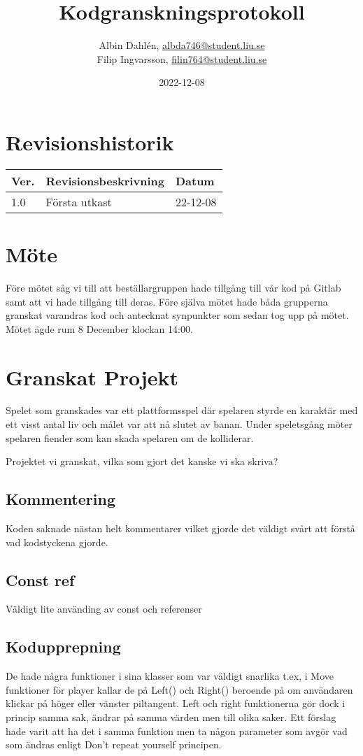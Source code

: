 \documentclass{TDP005mall}
\author{Albin Dahlén, \url{albda746@student.liu.se}\\
  Filip Ingvarsson, \url{filin764@student.liu.se}}
\title{Kodgranskningsprotokoll}
\date{2022-12-08}
\begin{document}
\projectpage
\section{Revisionshistorik}
\begin{table}[!h]
\begin{tabularx}{\linewidth}{|l|X|l|}
\hline
Ver. & Revisionsbeskrivning & Datum \\\hline
1.0 & Första utkast & 22-12-08 \\\hline
\end{tabularx}
\end{table}

\section{Möte}
Före mötet såg vi till att beställargruppen hade tillgång till vår kod på Gitlab samt att vi hade tillgång till deras.
Före själva mötet hade båda grupperna granskat varandras kod och antecknat synpunkter som sedan tog upp på mötet.
Mötet ägde rum 8 December klockan 14:00.

\section{Granskat Projekt}
Spelet som granskades var ett plattformsspel där spelaren styrde en karaktär med ett visst antal liv och målet var att nå slutet av banan.
Under speletsgång möter spelaren fiender som kan skada spelaren om de kolliderar.

Projektet vi granskat, vilka som gjort det kanske vi ska skriva?

\subsection{Kommentering}
Koden saknade nästan helt kommentarer vilket gjorde det väldigt svårt att förstå vad kodstyckena gjorde.


\subsection{Const ref}
Väldigt lite använding av const och referenser

\subsection{Kodupprepning}
De hade några funktioner i sina klasser som var väldigt snarlika t.ex, i Move funktioner för player kallar de på Left() och Right() beroende på om användaren klickar på höger eller vänster piltangent. Left och right funktionerna gör dock i princip samma sak, ändrar på samma värden men till olika saker. Ett förslag hade varit att ha det i samma funktion men ta någon parameter som avgör vad som ändras enligt Don't repeat yourself principen.
\end{document}
